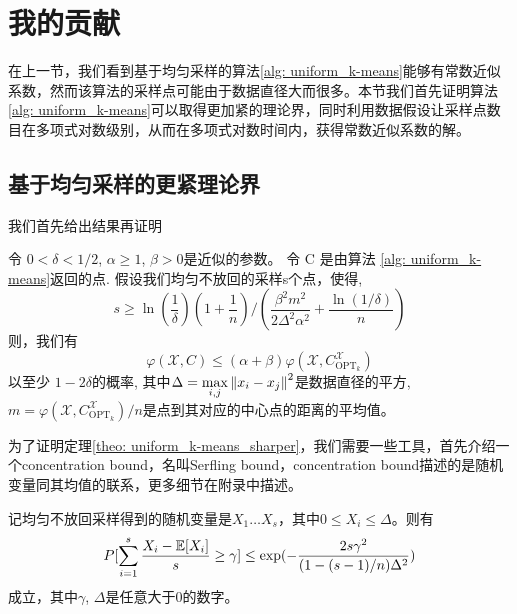 \section{我的贡献}

在上一节，我们看到基于均匀采样的算法\ref{alg: uniform_k-means}能够有常数近似系数，然而该算法的采样点可能由于数据直径大而很多。本节我们首先证明算法\ref{alg: uniform_k-means}可以取得更加紧的理论界，同时利用数据假设让采样点数目在多项式对数级别，从而在多项式对数时间内，获得常数近似系数的解。

\subsection{基于均匀采样的更紧理论界}
我们首先给出结果再证明
\begin{theorem}[均匀不放回采样的解的质量2]
    \label{theo: uniform_k-means_sharper}
    令 $0 < \delta <1/2$, $\alpha \geq 1$, $\beta >0$是近似的参数。 令 C 是由算法 \ref{alg: uniform_k-means}返回的点. 假设我们均匀不放回的采样s个点，使得,
    \begin{equation}
    s \geq \ln(\frac{1}{\delta})(1+\frac{1}{n})/(\frac{\beta^2 m^2}{2\Delta^2 \alpha^2}+\frac{\ln(1/\delta)}{n})
    \end{equation}
    则，我们有
    \begin{equation}
    \varphi(\mathcal{X},C) \leq (\alpha + \beta)\varphi(\mathcal{X},C_{\text{OPT}_k}^{\mathcal{X}})
    \end{equation}
    以至少 $1-2\delta$的概率, 其中$\Delta = \max\limits_{i,j}\left\lVert x_i - x_j\right\rVert^2$是数据直径的平方, $m = \varphi(\mathcal{X},C_{\text{OPT}_k}^{\mathcal{X}})/n$是点到其对应的中心点的距离的平均值。
\end{theorem}
为了证明定理\ref{theo: uniform_k-means_sharper}，我们需要一些工具，首先介绍一个concentration bound，名叫Serfling bound，concentration bound描述的是随机变量同其均值的联系，更多细节在附录中描述。
\begin{lemma}
    记均匀不放回采样得到的随机变量是$X_1 \ldots X_s$，其中$0 \leq X_i \leq \Delta$。则有
    \begin{equation}
    P[\sum_{i=1}^s \frac{X_i - \mathbb{E}[X_i]}{s} \geq \gamma] \leq \exp(-\frac{2s\gamma^2}{(1-(s-1)/n)\Delta^2})
    \end{equation}
    成立，其中$\gamma$, $\Delta$是任意大于0的数字。
\end{lemma}
